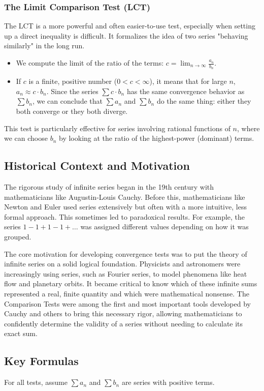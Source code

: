 \documentclass{article}
\begin{document}
\subsubsection{The Limit Comparison Test (LCT)}
The LCT is a more powerful and often easier-to-use test, especially when setting up a direct inequality is difficult. It formalizes the idea of two series "behaving similarly" in the long run.
\begin{itemize}
    \item We compute the limit of the ratio of the terms: \( c = \lim_{n \to \infty} \frac{a_n}{b_n} \).
    \item If \(c\) is a finite, positive number (\(0 < c < \infty\)), it means that for large \(n\), \(a_n \approx c \cdot b_n\). Since the series \(\sum c \cdot b_n\) has the same convergence behavior as \(\sum b_n\), we can conclude that \(\sum a_n\) and \(\sum b_n\) do the same thing: either they both converge or they both diverge.
\end{itemize}
This test is particularly effective for series involving rational functions of \(n\), where we can choose \(b_n\) by looking at the ratio of the highest-power (dominant) terms.

\subsection{Historical Context and Motivation}
The rigorous study of infinite series began in the 19th century with mathematicians like Augustin-Louis Cauchy. Before this, mathematicians like Newton and Euler used series extensively but often with a more intuitive, less formal approach. This sometimes led to paradoxical results. For example, the series \(1 - 1 + 1 - 1 + \dots\) was assigned different values depending on how it was grouped.

The core motivation for developing convergence tests was to put the theory of infinite series on a solid logical foundation. Physicists and astronomers were increasingly using series, such as Fourier series, to model phenomena like heat flow and planetary orbits. It became critical to know which of these infinite sums represented a real, finite quantity and which were mathematical nonsense. The Comparison Tests were among the first and most important tools developed by Cauchy and others to bring this necessary rigor, allowing mathematicians to confidently determine the validity of a series without needing to calculate its exact sum.

\subsection{Key Formulas}
For all tests, assume \(\sum a_n\) and \(\sum b_n\) are series with positive terms.
\end{document}
